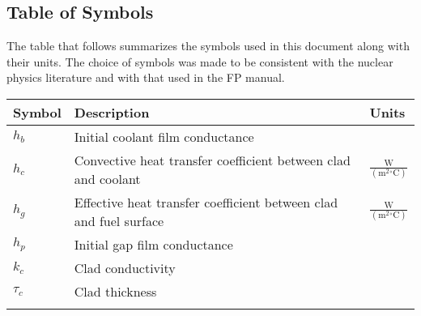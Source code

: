 \documentclass[12pt]{article}
\begin{document}
\subsection{Table of Symbols}
\label{Sec:ToS}
The table that follows summarizes the symbols used in this document along with their units. The choice of symbols was made to be consistent with the nuclear physics literature and with that used in the FP manual.
\begin{longtabu}{l X[l] l}
\toprule
Symbol & Description & Units
\\
\midrule
${h_{b}}$ & Initial coolant film conductance & 
\\
${h_{c}}$ & Convective heat transfer coefficient between clad and coolant & $\frac{\text{W}}{(\text{m}^{2}{}^{\circ}\text{C})}$
\\
${h_{g}}$ & Effective heat transfer coefficient between clad and fuel surface & $\frac{\text{W}}{(\text{m}^{2}{}^{\circ}\text{C})}$
\\
${h_{p}}$ & Initial gap film conductance & 
\\
${k_{c}}$ & Clad conductivity & 
\\
${\tau{}_{c}}$ & Clad thickness & 
\\
\bottomrule
\label{Table:ToS}
\end{longtabu}
\end{document}
